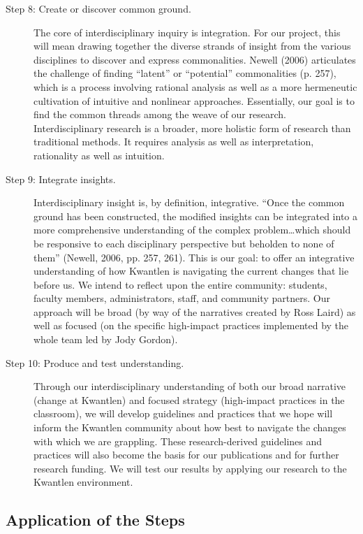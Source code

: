 \documentclass[letterpaper,10pt,headsepline]{scrreprt}
\begin{document}
\begin{description}
\item[Step 8: Create or discover common ground.] The core of interdisciplinary
  inquiry is integration. For our project, this will mean drawing together the
  diverse strands of insight from the various disciplines to discover and
  express commonalities. Newell (2006) articulates the challenge of finding
  ``latent'' or ``potential'' commonalities (p. 257), which is a process
  involving rational analysis as well as a more hermeneutic cultivation of
  intuitive and nonlinear approaches. Essentially, our goal is to find the
  common threads among the weave of our research. Interdisciplinary research
  is a broader, more holistic form of research than traditional methods. It
  requires analysis as well as interpretation, rationality as well as
  intuition.

\item[Step 9: Integrate insights.] Interdisciplinary insight is, by
  definition, integrative. ``Once the common ground has been constructed, the
  modified insights can be integrated into a more comprehensive understanding
  of the complex problem\ldots which should be responsive to each disciplinary
  perspective but beholden to none of them'' (Newell, 2006, pp. 257, 261). This
  is our goal: to offer an integrative understanding of how Kwantlen is
  navigating the current changes that lie before us. We intend to reflect upon
  the entire community: students, faculty members, administrators, staff, and
  community partners. Our approach will be broad (by way of the narratives
  created by Ross Laird) as well as focused (on the specific high-impact
  practices implemented by the whole team led by Jody Gordon).

\item[Step 10: Produce and test understanding.]
  Through our interdisciplinary understanding of both our broad narrative
  (change at Kwantlen) and focused strategy (high-impact practices in the
  classroom), we will develop guidelines and practices that we hope will
  inform the Kwantlen community about how best to navigate the changes with
  which we are grappling. These research-derived guidelines and practices will
  also become the basis for our publications and for further research funding.
  We will test our results by applying our research to the Kwantlen
  environment.

\end{description}

\subsection{Application of the Steps}
\end{document}
